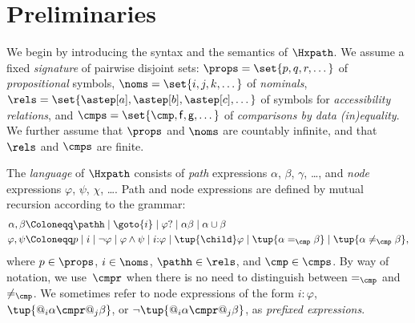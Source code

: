 \section{Preliminaries}
\label{sec:basic}

We begin by introducing the syntax and the semantics of $\Hxpath$.
We assume a fixed \emph{signature} of pairwise disjoint sets: $\props = \set{p, q, r, \dots}$ of \emph{propositional} symbols, $\noms = \set{i, j, k, \dots}$ of \emph{nominals}, $\rels = \set{\astep[a], \astep[b], \astep[c], \dots }$ of symbols for \emph{accessibility relations}, and $\cmps = \set{\cmp, \mathsf{f}, \mathsf{g},\dots}$ of \emph{comparisons by data (in)equality}.
We further assume that $\props$ and $\noms$ are countably infinite, and that $\rels$ and $\cmps$ are finite.
    
\begin{defi}\label{def:language}
  The \emph{language} of $\Hxpath$ consists of \emph{path} expressions $\alpha$, $\beta$, $\gamma$, \dots, and \emph{node} expressions $\varphi$, $\psi$, $\chi$, \dots.
  Path and node expressions are defined by mutual recursion according to the grammar:
  \begin{align*}
    \alpha, \beta & \Coloneqq
        \pathh \mid
        \goto{i} \mid
        \varphi? \mid
        \alpha \beta \mid
        \alpha \cup \beta \\
    \varphi, \psi & \Coloneqq
        p \mid
        i \mid
        \lnot \varphi \mid
        \varphi \land \psi \mid
        i{:}\varphi \mid 
        \tup{\child} \varphi \mid
        \tup{\alpha =_{\cmp} \beta} \mid
        \tup{\alpha \neq_{\cmp} \beta},
  \end{align*}
  \noindent where $p\in\props$, $i\in\noms$, $\pathh\in\rels$, and $\cmp\in\cmps$.
  By way of notation, we use~$\cmpr$ when there is no need to distinguish between $=_\cmp$ and $\neq_\cmp$.
  We sometimes refer to node expressions of the form $i{:}\varphi$, $\tup{@_i\alpha \cmpr @_j\beta}$, or $\lnot\tup{@_i\alpha \cmpr @_j\beta}$, as \emph{prefixed expressions}. 
\end{defi}


